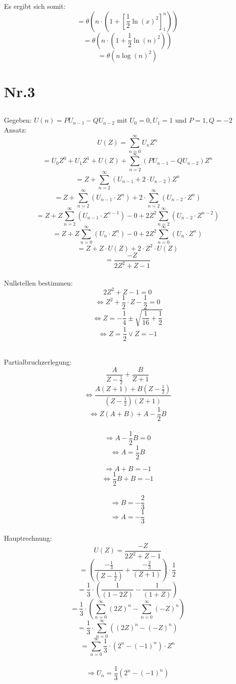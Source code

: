 \documentclass[a4paper,11pt,twoside]{article}
\begin{document}
Es ergibt sich somit:
\[= \theta(n \cdot (1+ [\frac{1}{2} \ln(x)^2]_1^n)) \]
\[= \theta(n \cdot (1+ \frac{1}{2} \ln(n)^2)) \]
\[= \theta(n\log(n)^2) \]

\pagebreak

\section*{Nr.3}
\subsection*{}

Gegeben: $U(n) = PU_{n-1}-QU_{n-2} $ mit $U_0 = 0, U_1 = 1$ und $P=1, Q=-2$ \\

Ansatz: \[ U(Z) = \sum_{n=0}^{\infty} U_nZ^n \]
 \[= U_0Z^0 + U_1Z^1 + U(Z) + \sum_{n=2}^{\infty} (PU_{n-1}-QU_{n-2})Z^n \]
 \[= Z +  \sum_{n=2}^{\infty} (U_{n-1}+2 \cdot U_{n-2})Z^n \]
\[= Z +  \sum_{n=2}^{\infty} (U_{n-1}\cdot Z^n ) + 2 \cdot \sum_{n=2}^{\infty} (U_{n-2}\cdot Z^n) \]
\[= Z+Z\sum_{n=2}^{\infty} (U_{n-1}\cdot Z^{n-1} ) - 0 + 2Z^2 \sum_{n=2}^{\infty} (U_{n-2}\cdot Z^{n-2} ) \]
\[= Z+Z\sum_{n=0}^{\infty} (U_{n}\cdot Z^{n} ) - 0 + 2Z^2 \sum_{n=0}^{\infty} (U_{n}\cdot Z^{n} ) \]
\[= Z+Z \cdot U(Z) + 2 \cdot Z^{2} \cdot U(Z) \]
\[= \frac{-Z}{2Z^2 + Z -1} \] \\

Nullstellen bestimmen: \\
\[2Z^2 + Z  -1 = 0\]
\[\Leftrightarrow Z^2+\frac{1}{2} \cdot Z - \frac{1}{2} = 0\]
\[\Leftrightarrow Z = -\frac{1}{4} \pm \sqrt{\frac{1}{16} + \frac{1}{2} }\]
\[\Leftrightarrow Z = \frac{1}{2} \vee Z = -1 \] \\

\pagebreak

Partialbruchzerlegung: \\
\[ \frac{A}{Z-\frac{1}{2}} + \frac{B}{Z+1} \]
\[\Leftrightarrow \frac{A(Z+1) + B(Z-\frac{1}{2})}{(Z-\frac{1}{2})(Z+1)} \]
\[\Leftrightarrow  Z(A+B)+A-\frac{1}{2}B \] \\

\[\Rightarrow A-\frac{1}{2}B = 0 \] 
\[\Leftrightarrow A = \frac{1}{2}B \] 

\[\Rightarrow A+B = -1 \] 
\[\Leftrightarrow  \frac{1}{2}B + B = -1\]  \\

\[\Rightarrow B = -\frac{2}{3} \] 
\[\Rightarrow A = -\frac{1}{3} \] \\

Hauptrechnung:
\[U(Z) = \frac{-Z}{2Z^2 + Z -1} \]
\[= (\frac{-\frac{1}{3}}{(Z-\frac{1}{2})} + \frac{-\frac{2}{3}}{(Z+1)}) \cdot \frac{1}{2} \]
\[= \frac{1}{3} \cdot ( \frac{1}{(1-2Z)} - \frac{1}{(1+Z)} ) \]
\[= \frac{1}{3} \cdot (\sum_{n=0}^{\infty} (2Z)^n - \sum_{n=0}^{\infty} (-Z)^n) \]
\[= \frac{1}{3} \cdot \sum_{n=0}^{\infty} ( (2Z)^n - (-Z)^n) \]
\[= \sum_{n=0}^{\infty} \frac{1}{3} \cdot ( 2^n - (-1)^n) \cdot Z^n \] \\

\[\Rightarrow U_n =\frac{1}{3} (2^n - (-1)^n) \]
\end{document}
